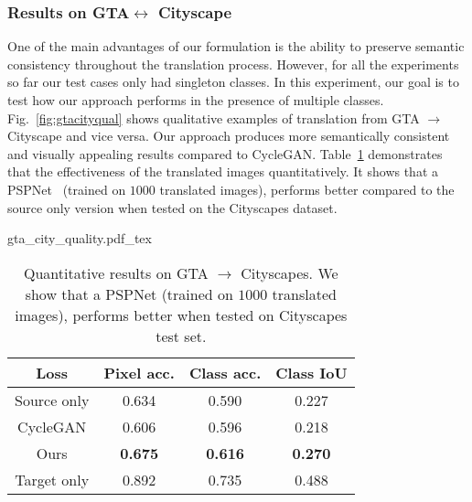 \subsubsection{Results on GTA$\leftrightarrow$ Cityscape}
One of the main advantages of our formulation is the ability to preserve semantic consistency throughout the translation process. However, for all the experiments so far our test cases only had singleton classes. In this experiment, our goal is to test how our approach performs in the presence of multiple classes. Fig.~\ref{fig:gtacityqual} shows qualitative examples of translation from GTA $\to$ Cityscape and vice versa. Our approach produces more semantically consistent and visually appealing results compared to CycleGAN. Table~\ref{tab:city} demonstrates that the effectiveness of the translated images quantitatively. It shows that a PSPNet~\cite{zhao2017pyramid} (trained on $1000$ translated images), performs better compared to the source only version when tested on the Cityscapes dataset.
\begin{figure*}[!hbpt]
    \centering
    \def\svgwidth{\textwidth}
    {gta_city_quality.pdf_tex}
    \caption[Qualitative results on GTA $\leftrightarrows$ CityScape.]{Domain transfer: GTA $\leftrightarrows$ CityScape. We show the performance of CycleGAN and our network. CycleGAN does not preserve underlying geometry and creates visual artifacts.}
    \label{fig:gtacityqual}
\end{figure*}

\begin{table}[!htpb]
    \begin{center}
        
            \begin{tabular}{c c c c}
                \textbf{Loss} & \textbf{Pixel acc.} & {\textbf{Class acc.}} & \textbf{Class IoU}\\
                \hline
                Source only & 0.634 & 0.590 & 0.227 \\
                CycleGAN    & 0.606 & 0.596 & 0.218 \\
                Ours        & \textbf{0.675} & \textbf{0.616} &  \textbf{0.270} \\
                \hline
                Target only & 0.892 & 0.735 & 0.488 \\
            \end{tabular}
    \end{center}
    \caption[Quantitative results on GTA $\to$ Cityscapes]{Quantitative results on GTA $\to$ Cityscapes. We show that a PSPNet (trained on $1000$ translated images), performs better when tested on Cityscapes test set.}
    \label{tab:city}
\end{table}


